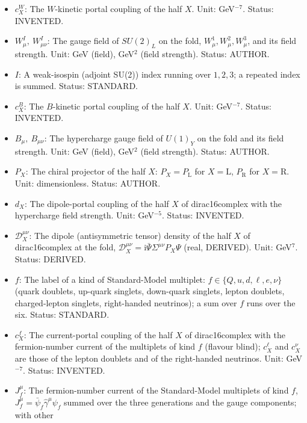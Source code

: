 \documentclass[
  10pt,
]{article}
\begin{document}
\begin{itemize}
  STANDARD.
\item
  \(c^{W}_X\): The \(W\)-kinetic portal coupling of the half \(X\).
  Unit: GeV\(^{-7}\). Status: INVENTED.
\item
  \(W^I_\mu,\ W^I_{\mu\nu}\): The gauge field of \(SU(2)_L\) on the
  fold, \(W^1_\mu, W^2_\mu, W^3_\mu\), and its field strength. Unit: GeV
  (field), GeV\(^2\) (field strength). Status: AUTHOR.
\item
  \(I\): A weak-isospin (adjoint SU(2)) index running over \(1, 2, 3\);
  a repeated index is summed. Status: STANDARD.
\item
  \(c^{B}_X\): The \(B\)-kinetic portal coupling of the half \(X\).
  Unit: GeV\(^{-7}\). Status: INVENTED.
\item
  \(B_\mu,\ B_{\mu\nu}\): The hypercharge gauge field of \(U(1)_Y\) on
  the fold and its field strength. Unit: GeV (field), GeV\(^2\) (field
  strength). Status: AUTHOR.
\item
  \(P_X\): The chiral projector of the half \(X\):
  \(P_X = P_{\mathrm{L}}\) for \(X = \mathrm{L}\), \(P_{\mathrm{R}}\)
  for \(X = \mathrm{R}\). Unit: dimensionless. Status: AUTHOR.
\item
  \(d_X\): The dipole-portal coupling of the half \(X\) of
  dirac16complex with the hypercharge field strength. Unit:
  GeV\(^{-5}\). Status: INVENTED.
\item
  \(\mathcal{D}_X^{\mu\nu}\): The dipole (antisymmetric tensor) density
  of the half \(X\) of dirac16complex at the fold,
  \(\mathcal{D}_X^{\mu\nu} = \mathrm{i}\bar\Psi\Sigma^{\mu\nu}P_X\Psi\)
  (real, DERIVED). Unit: GeV\(^7\). Status: DERIVED.
\item
  \(f\): The label of a kind of Standard-Model multiplet:
  \(f \in \{Q, u, d, \ell, e, \nu\}\) (quark doublets, up-quark
  singlets, down-quark singlets, lepton doublets, charged-lepton
  singlets, right-handed neutrinos); a sum over \(f\) runs over the six.
  Status: STANDARD.
\item
  \(c^{f}_X\): The current-portal coupling of the half \(X\) of
  dirac16complex with the fermion-number current of the multiplets of
  kind \(f\) (flavour blind); \(c^{\ell}_X\) and \(c^{\nu}_X\) are those
  of the lepton doublets and of the right-handed neutrinos. Unit:
  GeV\(^{-7}\). Status: INVENTED.
\item
  \(J_f^\mu\): The fermion-number current of the Standard-Model
  multiplets of kind \(f\), \(J_f^\mu = \bar\psi_f\hat\gamma^\mu\psi_f\)
  summed over the three generations and the gauge components; with other

\end{itemize}
\end{document}
